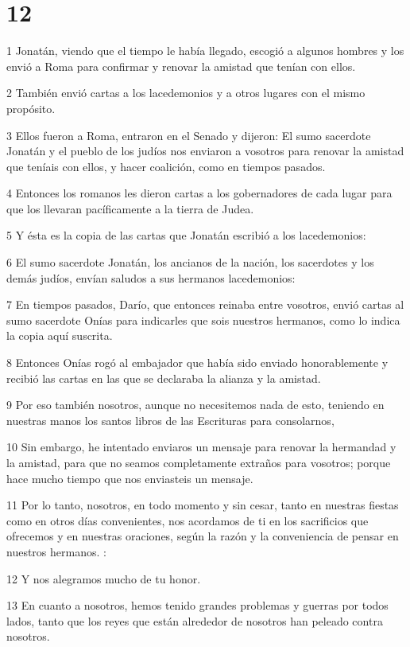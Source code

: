 \chapter{12}

\par 1 Jonatán, viendo que el tiempo le había llegado, escogió a algunos hombres y los envió a Roma para confirmar y renovar la amistad que tenían con ellos.
\par 2 También envió cartas a los lacedemonios y a otros lugares con el mismo propósito.
\par 3 Ellos fueron a Roma, entraron en el Senado y dijeron: El sumo sacerdote Jonatán y el pueblo de los judíos nos enviaron a vosotros para renovar la amistad que teníais con ellos, y hacer coalición, como en tiempos pasados.
\par 4 Entonces los romanos les dieron cartas a los gobernadores de cada lugar para que los llevaran pacíficamente a la tierra de Judea.
\par 5 Y ésta es la copia de las cartas que Jonatán escribió a los lacedemonios:
\par 6 El sumo sacerdote Jonatán, los ancianos de la nación, los sacerdotes y los demás judíos, envían saludos a sus hermanos lacedemonios:
\par 7 En tiempos pasados, Darío, que entonces reinaba entre vosotros, envió cartas al sumo sacerdote Onías para indicarles que sois nuestros hermanos, como lo indica la copia aquí suscrita.
\par 8 Entonces Onías rogó al embajador que había sido enviado honorablemente y recibió las cartas en las que se declaraba la alianza y la amistad.
\par 9 Por eso también nosotros, aunque no necesitemos nada de esto, teniendo en nuestras manos los santos libros de las Escrituras para consolarnos,
\par 10 Sin embargo, he intentado enviaros un mensaje para renovar la hermandad y la amistad, para que no seamos completamente extraños para vosotros; porque hace mucho tiempo que nos enviasteis un mensaje.
\par 11 Por lo tanto, nosotros, en todo momento y sin cesar, tanto en nuestras fiestas como en otros días convenientes, nos acordamos de ti en los sacrificios que ofrecemos y en nuestras oraciones, según la razón y la conveniencia de pensar en nuestros hermanos. :
\par 12 Y nos alegramos mucho de tu honor.
\par 13 En cuanto a nosotros, hemos tenido grandes problemas y guerras por todos lados, tanto que los reyes que están alrededor de nosotros han peleado contra nosotros.
